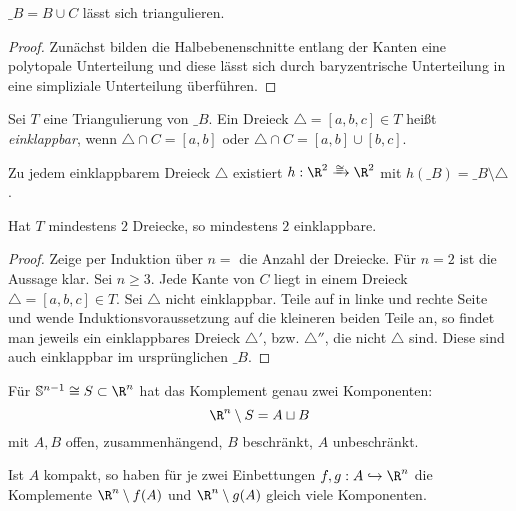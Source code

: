 \begin{lem}
	$\_B = B \cup C$ lässt sich triangulieren.
	\begin{proof}
		Zunächst bilden die Halbebenenschnitte entlang der Kanten eine polytopale Unterteilung und diese lässt sich durch baryzentrische Unterteilung in eine simpliziale Unterteilung überführen.
	\end{proof}
\end{lem}

\begin{df}
	Sei $T$ eine Triangulierung von $\_B$.
	Ein Dreieck $\triangle = [a,b,c] \in T$ heißt \emph{einklappbar}, wenn $\triangle \cap C = [a,b]$ oder $\triangle \cap C = [a,b] \cup [b,c]$.
\end{df}

\begin{lem}
	Zu jedem einklappbarem Dreieck $\triangle$ existiert $h: \R^2 \homeomorphicto \R^2$ mit $h(\_B) = \_{B \setminus \triangle}$.
\end{lem}

\begin{lem}
	Hat $T$ mindestens $2$ Dreiecke, so mindestens $2$ einklappbare.
	\begin{proof}
		Zeige per Induktion über $n = $ die Anzahl der Dreiecke.
		Für $n = 2$ ist die Aussage klar.
		Sei $n \ge 3$.
		Jede Kante von $C$ liegt in einem Dreieck $\triangle = [a,b,c] \in T$.
		Sei $\triangle$ \oBdA nicht einklappbar.
		Teile auf in linke und rechte Seite und wende Induktionsvoraussetzung auf die kleineren beiden Teile an, so findet man jeweils ein einklappbares Dreieck $\triangle'$, bzw. $\triangle''$, die nicht $\triangle$ sind.
		Diese sind auch einklappbar im ursprünglichen $\_B$.
	\end{proof}
\end{lem}


\begin{st}
	Für $\S^{n-1} \homeomorphic S \subset \R^n$ hat das Komplement genau zwei Komponenten:
	\[
		\R^n \setminus S
		= A \dunion B
	\]
	mit $A, B$ offen, zusammenhängend, $B$ beschränkt, $A$ unbeschränkt.
\end{st}

\begin{st}[Alexander]
	Ist $A$ kompakt, so haben für je zwei Einbettungen $f, g: A \injto \R^n$ die Komplemente $\R^n \setminus f(A)$ und $\R^n \setminus g(A)$ gleich viele Komponenten.
\end{st}

